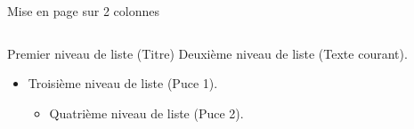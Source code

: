 \begin{frame}{Mise en page sur 2 colonnes}
\begin{columns}
\begin{column}[t]{0.45\textwidth}
            \begin{block}{Premier niveau de liste (Titre)}
            Deuxième niveau de liste (Texte courant).
              \begin{itemize}
                \item Troisième niveau de liste (Puce 1).
                    \begin{itemize}
                      \item Quatrième niveau de liste (Puce 2).
                    \end{itemize}
              \end{itemize}
            \end{block}
 
          \end{column}
          
   \end{columns}
 \end{frame}

